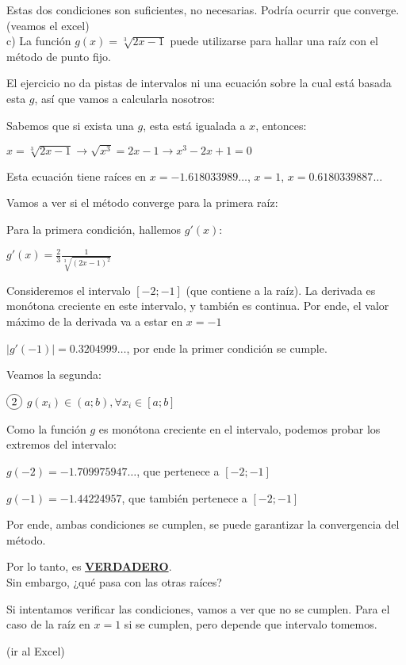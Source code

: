 \documentclass[11pt]{article}
\newcommand*\circled[1]{\tikz[baseline=(char.base)]{
		\node[shape=circle,draw,inner sep=2pt] (char) {#1};}}
\begin{document}
	Estas dos condiciones son suficientes, no necesarias. Podría ocurrir que converge. (veamos el excel)\\
	
	c) La función $\displaystyle g(x)=\sqrt[3]{2x-1}$ puede utilizarse para hallar una raíz con el método de punto fijo.
	
	El ejercicio no da pistas de intervalos ni una ecuación sobre la cual está basada esta $g$, así que vamos a calcularla nosotros:
	
	Sabemos que si exista una $g$, esta está igualada a $x$, entonces:
	
	$x=\sqrt[3]{2x-1} \rightarrow \sqrt{x^3}=2x-1 \rightarrow x^3-2x+1=0$
	
	Esta ecuación tiene raíces en $x=-1.618033989\dots$, $x=1$, $x=0.6180339887\dots$
	
	Vamos a ver si el método converge para la primera raíz:
	
	Para la primera condición, hallemos $g'(x)$:
	
	$\displaystyle g'(x)=\frac{2}{3}\frac{1}{\sqrt[3]{(2x-1)^2}}$
	
	Consideremos el intervalo $[-2; -1]$ (que contiene a la raíz). La derivada es monótona creciente en este intervalo, y también es continua. Por ende, el valor máximo de la derivada va a estar en $x=-1$
	
	$|g'(-1)|=0.3204999\dots$, por ende la primer condición se cumple.
	
	Veamos la segunda:
	
	$\circled{2}$ $g(x_i) \in (a;b), \forall x_i \in [a;b]$
	
	Como la función $g$ es monótona creciente en el intervalo, podemos probar los extremos del intervalo:
	
	$g(-2)=-1.709975947\dots$, que pertenece a $[-2;-1]$
	
	$g(-1)=-1.44224957$, que también pertenece a $[-2;-1]$
	
	Por ende, ambas condiciones se cumplen, se puede garantizar la convergencia del método.
	
	Por lo tanto, es \textbf{\underline{VERDADERO}}.\\
	
	Sin embargo, ¿qué pasa con las otras raíces?
	
	Si intentamos verificar las condiciones, vamos a ver que no se cumplen. Para el caso de la raíz en $x=1$ si se cumplen, pero depende que intervalo tomemos.
	
	(ir al Excel)
	
\end{document}
